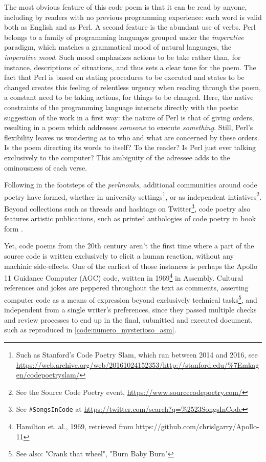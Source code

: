 The most obvious feature of this code poem is that it can be read by anyone, including by readers with no previous programming experience: each word is valid both as English and as Perl. A second feature is the abundant use of verbs. Perl belongs to a family of programming languages grouped under the \emph{imperative} paradigm, which matches a grammatical mood of natural languages, the \emph{imperative mood}. Such mood emphasizes actions to be take rather than, for instance, descriptions of situations, and thus sets a clear tone for the poem. The fact that Perl is based on stating procedures to be executed and states to be changed creates this feeling of relentless urgency when reading through the poem, a constant need to be taking actions, for things to be changed. Here, the native constraints of the programming language interacts directly with the poetic suggestion of the work in a first way: the nature of Perl is that of giving orders, resulting in a poem which addresses \emph{someone} to execute \emph{something}. Still, Perl's flexibility leaves us wondering as to who and what are concerned by these orders. Is the poem directing its words to itself? To the reader? Is Perl just ever talking exclusively to the computer? This ambiguity of the adressee adds to the ominousness of each verse.

Following in the footsteps of the \emph{perlmonks}, additional communities around code poetry have formed, whether in university settings\footnote{Such as Stanford's Code Poetry Slam, which ran between 2014 and 2016, see \url{https://web.archive.org/web/20161024152353/http://stanford.edu/\%7Emkagen/codepoetryslam/} }, or as independent intiatives\footnote{See the Source Code Poetry event, \url{https://www.sourcecodepoetry.com/}}. Beyond collections such as threads and hashtags on Twitter\footnote{See \lstinline{#SongsInCode} at \url{https://twitter.com/search?q=\%2523SongsInCode}}, code poetry also features artistic publications, such as printed anthologies of code poetry in book form \citep{bertram_code_2012} \citep{holden_code_2016}.

Yet, code poems from the 20th century aren't the first time where a part of the source code is written exclusively to elicit a human reaction, without any machinic side-effects. One of the earliest of those instances is perhaps the Apollo 11 Guidance Computer (AGC) code, written in 1969\footnote{Hamilton et. al., 1969, retrieved from https://github.com/chrislgarry/Apollo-11} in Assembly. Cultural references and jokes are peppered throughout the text as comments, asserting computer code as a means of expression beyond exclusively technical tasks\footnote{See also: "Crank that wheel", "Burn Baby Burn"}, and independent from a single writer's preferences, since they passed multiple checks and review processes to end up in the final, submitted and executed document, such as reproduced in \ref{code:numero_mysterioso_asm}.

